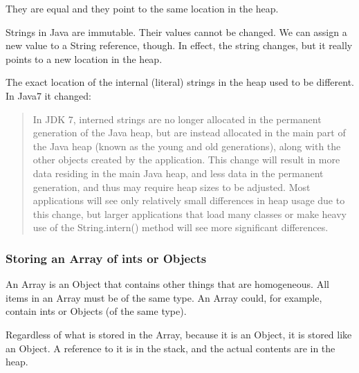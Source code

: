 They are equal and they point to the same location in the heap.

Strings in Java are immutable. Their values cannot be changed. We can assign a new value to a String reference, though. In effect, the string changes, but it really points to a new location in the heap.

The exact location of the internal (literal) strings in the heap used to be different. In Java7 it changed\cite{java7}:

\begin{quotation}
In JDK 7, interned strings are no longer allocated in the permanent generation of the Java heap, but are instead allocated in the main part of the Java heap (known as the young and old generations), along with the other objects created by the application. This change will result in more data residing in the main Java heap, and less data in the permanent generation, and thus may require heap sizes to be adjusted. Most applications will see only relatively small differences in heap usage due to this change, but larger applications that load many classes or make heavy use of the String.intern() method will see more significant differences.
\end{quotation}


\subsubsection{Storing an Array of ints or Objects}
An Array is an Object that contains other things that are homogeneous. All items in an Array must be of the same type. An Array could, for example, contain ints or Objects (of the same type). 

Regardless of what is stored in the Array, because it is an Object, it is stored like an Object. A reference to it is in the stack, and the actual contents are in the heap.